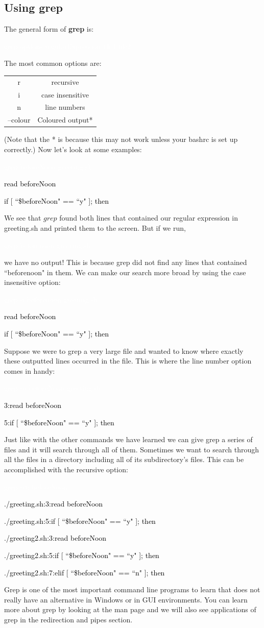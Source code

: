 \documentclass[oneside]{book}
\newcommand{\commandline}[1]{\begin{center} \colorbox{Dark}{\textcolor{white}{#1}} \end{center}}
\newcommand{\exampleout}[1]{\begin{center} \colorbox{Light}{\textcolor{black}{#1}} \end{center}}
\begin{document}
\subsection{Using grep}
    The general form of \textbf{grep} is:
    \commandline{grep options regularExpression file1 file2 ...}
    The most common options are:
\begin{center}
\begin{tabular}{|c|c|}
    \hline
    r & recursive \\
    i & case insensitive \\
    n & line numbers \\ 
    --colour & Coloured output* \\ \hline
\end{tabular}
\end{center}
(Note that the * is because this may not work unless your bashrc is set up correctly.)
Now let's look at some examples:
    \commandline{grep beforeNoon greeting.sh}
    \exampleout{read beforeNoon}
    \exampleout{if [ ``\$beforeNoon" == ``y" ]; then}
We see that $grep$ found both lines that contained our regular expression in greeting.sh and printed them to the screen. But if we run,
\commandline{grep beforenoon greeting.sh}
we have no output! This is because grep did not find any lines that contained ``beforenoon" in them. We can make our search more broad by using the case insensitive option:
    \commandline{grep -i beforenoon greeting.sh}
    \exampleout{read beforeNoon}
    \exampleout{if [ ``\$beforeNoon" == ``y" ]; then}
Suppose we were to grep a very large file and wanted to know where exactly these outputted lines occurred in the file. This is where the line number option comes in handy:
    \commandline{grep -n beforeNoon greeting.sh}
    \exampleout{3:read beforeNoon}
    \exampleout{5:if [ ``\$beforeNoon" == ``y" ]; then}
Just like with the other commands we have learned we can give grep a series of files and it will search through all of them. Sometimes we want to search through all the files in a directory including all of its subdirectory's files. This can be accomplished with the recursive option:
    \commandline{grep -rn beforeNoon . }
    \exampleout{./greeting.sh:3:read beforeNoon}
    \exampleout{./greeting.sh:5:if [ ``\$beforeNoon" == ``y" ]; then}
    \exampleout{./greeting2.sh:3:read beforeNoon}
    \exampleout{./greeting2.sh:5:if [ ``\$beforeNoon" == ``y" ]; then}
    \exampleout{./greeting2.sh:7:elif [ ``\$beforeNoon" == ``n" ]; then}
Grep is one of the most important command line programs to learn that does not really have an alternative in Windows or in GUI environments. You can learn more about grep by looking at the man page and we will also see applications of grep in the redirection and pipes section.
    
\end{document}
